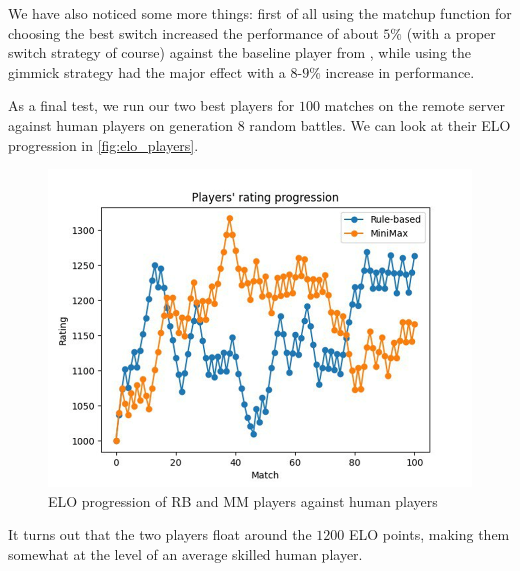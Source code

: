 We have also noticed some more things: first of all using the matchup function for choosing the best switch increased the performance of about $5\%$ (with a proper switch strategy of course) against the baseline player from \cite{poke_env}, while using the gimmick strategy had the major effect with a $8$-$9\%$ increase in performance.

As a final test, we run our two best players for $100$ matches on the remote server \cite{remote_server} against human players on generation $8$ random battles. We can look at their ELO progression in \autoref{fig:elo_players}.
\begin{figure}[!htbp]
    \centering
    \includegraphics[width=0.8\linewidth]{images/elo_players.png}
    \caption{ELO progression of RB and MM players against human players}
    \label{fig:elo_players}
\end{figure}
It turns out that the two players float around the $1200$ ELO points, making them somewhat at the level of an average skilled human player.

